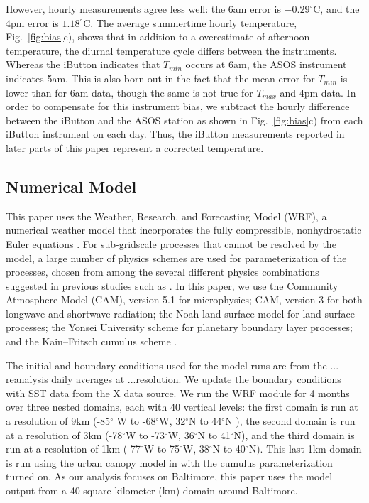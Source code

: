 \documentclass[draft,linenumbers]{agujournal}
\begin{document}
However, hourly measurements agree less well: the 6am error is $-0.29^\circ$C, and the 4pm error is $1.18^\circ$C. The average summertime hourly temperature, Fig.~\ref{fig:bias}c), shows that in addition to a overestimate of afternoon temperature, the diurnal temperature cycle differs between the instruments. Whereas the iButton indicates that $T_{min}$ occurs at 6am, the ASOS instrument indicates 5am. This is also born out in the fact that the mean error for $T_{min}$ is lower than for 6am data, though the same is not true for $T_{max}$ and 4pm data. In order to compensate for this instrument bias, we subtract the hourly difference between the iButton and the ASOS station as shown in Fig.~\ref{fig:bias}c) from each iButton instrument on each day. Thus, the iButton measurements reported in later parts of this paper represent a corrected temperature.  

\subsection{Numerical Model}
This paper uses the Weather, Research, and Forecasting Model (WRF), a numerical weather model that incorporates the fully
compressible, nonhydrostatic Euler equations \cite{skamarock2008description}. %
For sub-gridscale processes that cannot be resolved by the model, a large number of physics schemes are 
used for parameterization of the processes, chosen from among the
several different physics combinations suggested in
previous studies such as \cite{argueso2011evaluation, giannakopoulou2012persian, efstathiou2013sensitivity, zittis2014comparison}. %
In this paper, we use the
Community Atmosphere Model (CAM), version 5.1 \citep{neale2010description} %
for microphysics; CAM, version 3 \citep{collins2004description} %
for both longwave and shortwave radiation;
the Noah land surface model \citep{ek2003implementation} %
for land surface processes; 
the Yonsei University scheme \citep{hong2006new} %
for planetary boundary layer processes;
and the Kain–Fritsch cumulus scheme \citep{kain1990one}. %

The initial and boundary conditions
used for the model runs are from the ...
reanalysis daily averages at ...resolution. We update the boundary conditions with SST data from the X data source. 
We run the WRF module for 4 months over three nested domains, each with 40 vertical levels: the first domain is run at a resolution of 9km (-85$^\circ$ W to -68$^\circ$W, 32$^\circ$N to 44$^\circ$N ), the second domain is run at a resolution of 3km (-78$^\circ$W to -73$^\circ$W, 36$^\circ$N to 41$^\circ$N), and the third domain is run at a resolution of 1km (-77$^\circ$W to-75$^\circ$W, 38$^\circ$N to 40$^\circ$N). This last 1km domain is run using the urban canopy model in \cite{chen2011integrated} with the cumulus parameterization turned on. 
As our analysis focuses on Baltimore, this paper uses the model output from a 40 square kilometer (km) domain around Baltimore.
\end{document}
